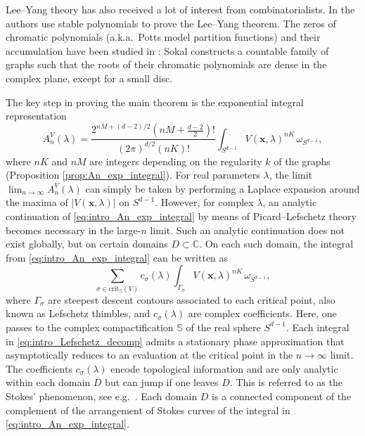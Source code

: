 \documentclass[11pt, a4paper]{article}
\numberwithin{theorem}{section}
\theoremstyle{remark}
\newcommand{\CC}{\mathbb{C}}
\newcommand{\bb}[1]{\boldsymbol{#1}}
\newcommand{\Sc}{\mathbb{S}}
\theoremstyle{theorem}
\begin{document}
Lee--Yang theory has also received a lot of interest from combinatorialists. In \cite{borcea2009lee} the authors use stable polynomials to prove the Lee--Yang theorem. 
The zeros of chromatic polynomials (a.k.a.\ Potts model partition functions) and their accumulation have been studied in \cite{sokal2004chromatic}: Sokal constructs a countable family of graphs such that the roots of their chromatic polynomials are dense in the complex plane, except for a small disc. \par 

The key step in proving the main theorem is the exponential integral representation
\begin{equation}
    \label{eq:intro_An_exp_integral}
    A^V_n (\lambda) = \frac{2^{nM + (d-2)/2} \left(nM +\frac{d-2}{2}\right)!}{(2\pi)^{d/2} (nK)!} \int_{S^{d-1}} V(\bb{x},\lambda)^{nK} \,\omega_{S^{d-1}},
\end{equation}
where $nK$ and $nM$ are integers depending on the regularity $k$ of the graphs (Proposition \ref{prop:An_exp_integral}). For real parameters $\lambda$, the limit $\lim_{n\rightarrow\infty} A^V_n(\lambda)$ can simply be taken by performing a Laplace expansion around the maxima of $|V(\bb{x},\lambda)|$ on $S^{d-1}$. However, for complex $\lambda$, an analytic continuation of \eqref{eq:intro_An_exp_integral} by means of Picard--Lefschetz theory becomes necessary in the large-$n$ limit. Such an analytic continuation does not exist globally, but on certain domains $D \subset \CC$. On each such domain, the integral from \eqref{eq:intro_An_exp_integral} can be written as
\begin{equation}
  \label{eq:intro_Lefschetz_decomp}
  \sum_{\sigma \in \mathrm{crit}_{\Sc}(V)} c_\sigma(\lambda) \int_{\Gamma_\sigma} V(\bb{x},\lambda)^{nK} \,\omega_{S^{d-1}},
\end{equation}
where $\Gamma_\sigma$ are steepest descent contours associated to each critical point, also known as Lefschetz thimbles, and $c_\sigma(\lambda)$ are complex coefficients. Here, one passes to the complex compactification $\Sc$ of the real sphere $S^{d-1}$. Each integral in \eqref{eq:intro_Lefschetz_decomp} admits a stationary phase approximation that asymptotically reduces to an evaluation at the critical point in the $n\rightarrow\infty$ limit. 
The coefficients $c_\sigma(\lambda)$ encode topological information and are only analytic within each domain $D$ but can jump if one leaves $D$. This is referred to as the Stokes' phenomenon, see e.g.\ \cite{pham1985descente}. Each domain $D$ is a connected component of the complement of the arrangement of Stokes curves of the integral in \eqref{eq:intro_An_exp_integral}. \par
\end{document}
